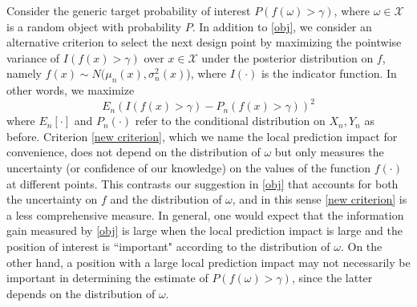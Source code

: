 \documentclass{wscpaperproc}
\theoremstyle{wsc}
\begin{document}
Consider the generic target probability of interest $P(f(\omega)>\gamma)$, where $\omega \in \mathcal{X}$ is a random object with probability $P$. In addition to \eqref{obj}, we consider an alternative criterion to select the next design point by maximizing the pointwise variance of $I(f(x)>\gamma)$ over $x\in \mathcal{X}$ under the posterior distribution on $f$, namely $f(x)\sim N(\mu_n(x),\sigma_n^2(x)$), where $I(\cdot)$ is the indicator function. In other words, we maximize 
\begin{equation}
E_n\left( I\left(f(x) > \gamma\right)- P_n\left(f(x) > \gamma\right) \right)^2\label{new criterion}
\end{equation}
where $E_n[\cdot]$ and $P_n(\cdot)$ refer to the conditional distribution on $X_n,Y_n$ as before. Criterion \eqref{new criterion}, which we name the local prediction impact for convenience, does not depend on the distribution of $\omega$ but only measures the uncertainty (or confidence of our knowledge) on the values of the function $f(\cdot)$ at different points. This contrasts our suggestion in \eqref{obj} that accounts for both the uncertainty on $f$ and the distribution of $\omega$, and in this sense \eqref{new criterion} is a less comprehensive measure. In general, one would expect that the information gain measured by \eqref{obj} is large when the local prediction impact is large and the position of interest is ``important" according to the distribution of $\omega$. On the other hand, a position with a large local prediction impact may not necessarily be important in determining the estimate of $P(f(\omega)>\gamma)$, since the latter depends on the distribution of $\omega$. 

\end{document}
